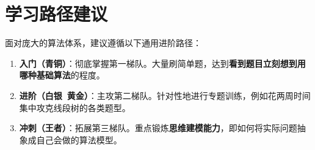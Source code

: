 \documentclass[12pt,a4paper]{article}
\begin{document}
	\section{学习路径建议}
	面对庞大的算法体系，建议遵循以下通用进阶路径：
	
	\begin{enumerate}[label=\arabic*.]
		\item \textbf{入门（青铜）}：彻底掌握第一梯队。大量刷简单题，达到\textbf{看到题目立刻想到用哪种基础算法}的程度。
		\item \textbf{进阶（白银~黄金）}：主攻第二梯队。针对性地进行专题训练，例如花两周时间集中攻克线段树的各类题型。
		\item \textbf{冲刺（王者）}：拓展第三梯队。重点锻炼\textbf{思维建模能力}，即如何将实际问题抽象成自己会做的算法模型。
	\end{enumerate}
	
	\begin{center}
	\end{center}
	
\end{document}
